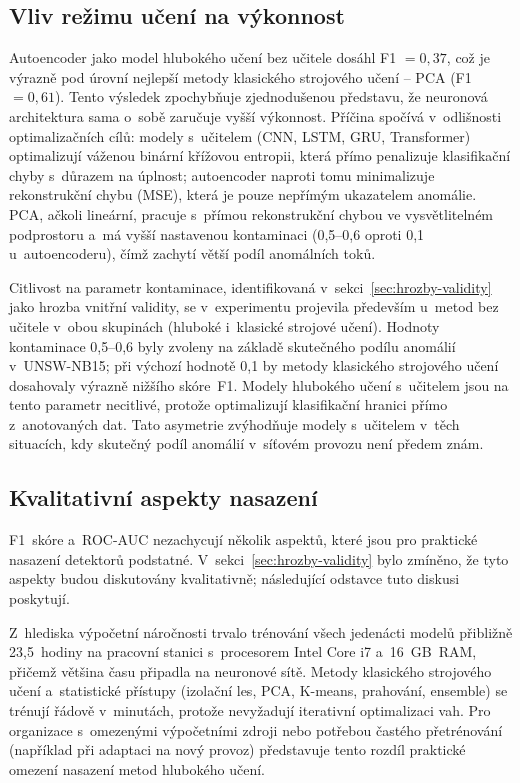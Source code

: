 \subsection{Vliv režimu učení na výkonnost}
\label{sec:diskuse-rezim-uceni}

Autoencoder jako model hlubokého učení bez učitele dosáhl F1 $= 0{,}37$, což je výrazně pod úrovní nejlepší metody klasického strojového učení -- PCA (F1 $= 0{,}61$). Tento výsledek zpochybňuje zjednodušenou představu, že neuronová architektura sama o~sobě zaručuje vyšší výkonnost. Příčina spočívá v~odlišnosti optimalizačních cílů: modely s~učitelem (CNN, LSTM, GRU, Transformer) optimalizují váženou binární křížovou entropii, která přímo penalizuje klasifikační chyby s~důrazem na úplnost; autoencoder naproti tomu minimalizuje rekonstrukční chybu (MSE), která je pouze nepřímým ukazatelem anomálie. PCA, ačkoli lineární, pracuje s~přímou rekonstrukční chybou ve vysvětlitelném podprostoru a~má vyšší nastavenou kontaminaci (0{,}5--0{,}6 oproti 0{,}1 u~autoencoderu), čímž zachytí větší podíl anomálních toků.

Citlivost na parametr kontaminace, identifikovaná v~sekci~\ref{sec:hrozby-validity} jako hrozba vnitřní validity, se v~experimentu projevila především u~metod bez učitele v~obou skupinách (hluboké i~klasické strojové učení). Hodnoty kontaminace 0{,}5--0{,}6 byly zvoleny na základě skutečného podílu anomálií v~UNSW-NB15; při výchozí hodnotě 0{,}1 by metody klasického strojového učení dosahovaly výrazně nižšího skóre~F1. Modely hlubokého učení s~učitelem jsou na tento parametr necitlivé, protože optimalizují klasifikační hranici přímo z~anotovaných dat. Tato asymetrie zvýhodňuje modely s~učitelem v~těch situacích, kdy skutečný podíl anomálií v~síťovém provozu není předem znám.

\subsection{Kvalitativní aspekty nasazení}
\label{sec:diskuse-kvalitativni}

F1~skóre a~ROC-AUC nezachycují několik aspektů, které jsou pro praktické nasazení detektorů podstatné. V~sekci~\ref{sec:hrozby-validity} bylo zmíněno, že tyto aspekty budou diskutovány kvalitativně; následující odstavce tuto diskusi poskytují.

Z~hlediska výpočetní náročnosti trvalo trénování všech jedenácti modelů přibližně 23{,}5~hodiny na pracovní stanici s~procesorem Intel Core i7 a~16~GB~RAM, přičemž většina času připadla na neuronové sítě. Metody klasického strojového učení a~statistické přístupy (izolační les, PCA, K-means, prahování, ensemble) se trénují řádově v~minutách, protože nevyžadují iterativní optimalizaci vah. Pro organizace s~omezenými výpočetními zdroji nebo potřebou častého přetrénování (například při adaptaci na nový provoz) představuje tento rozdíl praktické omezení nasazení metod hlubokého učení.

